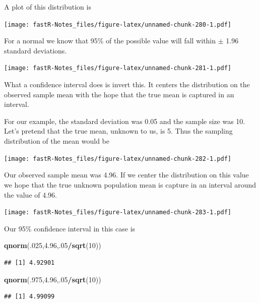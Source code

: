\documentclass[]{book}
\newenvironment{Shaded}{\begin{snugshade}}{\end{snugshade}}
\newcommand{\KeywordTok}[1]{\textcolor[rgb]{0.13,0.29,0.53}{\textbf{#1}}}
\newcommand{\DecValTok}[1]{\textcolor[rgb]{0.00,0.00,0.81}{#1}}
\newcommand{\FloatTok}[1]{\textcolor[rgb]{0.00,0.00,0.81}{#1}}
\newcommand{\OperatorTok}[1]{\textcolor[rgb]{0.81,0.36,0.00}{\textbf{#1}}}
\newcommand{\NormalTok}[1]{#1}
\theoremstyle{definition}
\theoremstyle{definition}
\theoremstyle{definition}
\theoremstyle{remark}
\begin{document}
A plot of this distribution is

\texttt{[image: fastR-Notes\_files/figure-latex/unnamed-chunk-280-1.pdf]}

For a normal we know that 95\% of the possible value will fall within
\(\pm\) 1.96 standard deviations.

\texttt{[image: fastR-Notes\_files/figure-latex/unnamed-chunk-281-1.pdf]}

What a confidence interval does is invert this. It centers the
distribution on the observed sample mean with the hope that the true
mean is captured in an interval.

For our example, the standard deviation was 0.05 and the sample size was
10. Let's pretend that the true mean, unknown to us, is 5. Thus the
sampling distribution of the mean would be

\texttt{[image: fastR-Notes\_files/figure-latex/unnamed-chunk-282-1.pdf]}

Our observed sample mean was 4.96. If we center the distribution on this
value we hope that the true unknown population mean is capture in an
interval around the value of 4.96.

\texttt{[image: fastR-Notes\_files/figure-latex/unnamed-chunk-283-1.pdf]}

Our 95\% confidence interval in this case is

\begin{Shaded}
\begin{Highlighting}[]
\KeywordTok{qnorm}\NormalTok{(.}\DecValTok{025}\NormalTok{,}\FloatTok{4.96}\NormalTok{,.}\DecValTok{05}\OperatorTok{/}\KeywordTok{sqrt}\NormalTok{(}\DecValTok{10}\NormalTok{))}
\end{Highlighting}
\end{Shaded}

\begin{verbatim}
## [1] 4.92901
\end{verbatim}

\begin{Shaded}
\begin{Highlighting}[]
\KeywordTok{qnorm}\NormalTok{(.}\DecValTok{975}\NormalTok{,}\FloatTok{4.96}\NormalTok{,.}\DecValTok{05}\OperatorTok{/}\KeywordTok{sqrt}\NormalTok{(}\DecValTok{10}\NormalTok{))}
\end{Highlighting}
\end{Shaded}

\begin{verbatim}
## [1] 4.99099
\end{verbatim}
\end{document}
